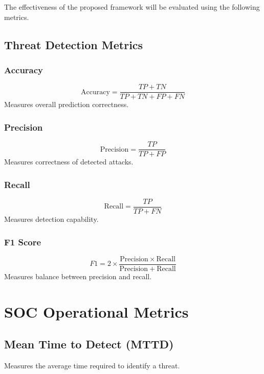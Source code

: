 \documentclass[12pt,a4paper]{report}
\begin{document}
The effectiveness of the proposed framework will be evaluated using the following metrics.

\subsection{Threat Detection Metrics}

\subsubsection{Accuracy}
\begin{equation}
\mathrm{Accuracy} = \frac{TP + TN}{TP + TN + FP + FN}
\end{equation}
Measures overall prediction correctness.

\subsubsection{Precision}
\begin{equation}
\mathrm{Precision} = \frac{TP}{TP + FP}
\end{equation}
Measures correctness of detected attacks.

\subsubsection{Recall}
\begin{equation}
\mathrm{Recall} = \frac{TP}{TP + FN}
\end{equation}
Measures detection capability.

\subsubsection{F1 Score}
\begin{equation}
F1 = 2 \times \frac{\mathrm{Precision} \times \mathrm{Recall}}{\mathrm{Precision} + \mathrm{Recall}}
\end{equation}
Measures balance between precision and recall.

\section{SOC Operational Metrics}
\label{sec:soc_metrics}

\subsection{Mean Time to Detect (MTTD)}
Measures the average time required to identify a threat.
\end{document}
